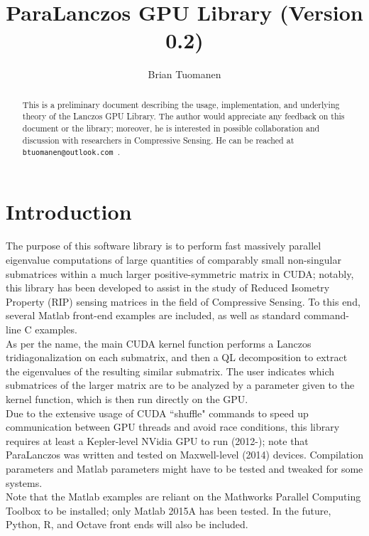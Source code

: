 \documentclass{amsart}
\title{ParaLanczos GPU Library (Version 0.2)}
\author[Tuomanen]{Brian Tuomanen}
\begin{document}
\maketitle

\begin{abstract}
This is a preliminary document describing the usage, implementation, and underlying theory of the  Lanczos GPU Library.  The author would appreciate any feedback on this document or the library;  moreover, he is interested in possible collaboration and discussion with researchers in Compressive Sensing.  He can be reached at {\tt btuomanen@outlook.com }.
\end{abstract}


\section{Introduction}



The purpose of this software library is to perform fast massively parallel eigenvalue computations of large quantities of comparably small non-singular submatrices within a much larger positive-symmetric matrix in CUDA;  notably, this library has been developed to assist in the study of Reduced Isometry Property (RIP) sensing matrices in the field of Compressive Sensing.  To this end, several Matlab front-end examples are included, as well as standard command-line C examples.\\

As per the name, the main CUDA kernel function performs a Lanczos tridiagonalization on each submatrix, and then a QL decomposition to extract the eigenvalues of the resulting similar submatrix.  The user indicates which submatrices of the larger matrix are to be analyzed by a parameter given to the kernel function, which is then run directly on the GPU.\\ 

Due to the extensive usage of CUDA ``shuffle" commands to speed up communication between GPU threads and avoid race conditions, this library requires at least a Kepler-level NVidia GPU to run (2012-);  note that ParaLanczos was written and tested on Maxwell-level (2014) devices.  Compilation  parameters and Matlab parameters might have to be tested and tweaked for some systems.\\

Note that the Matlab examples are reliant on the Mathworks Parallel Computing Toolbox to be installed;  only Matlab 2015A has been tested.  In the future, Python, R, and Octave front ends will also be included.\\ 
\end{document}
